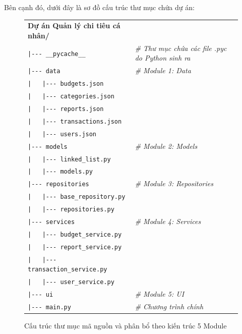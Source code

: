 \documentclass[12pt,letterpaper]{article}
\begin{document}
Bên cạnh đó, dưới đây là sơ đồ cấu trúc thư mục chứa dự án:
\begin{figure}[H]
    \centering
    \renewcommand{\arraystretch}{1.3} %
    \begin{tabular}{@{} l l @{}} %
    \textbf{Dự án Quản lý chi tiêu cá nhân/} & \\
    \texttt{|-\/-\/- \_\_pycache\_\_} & \textit{\# Thư mục chứa các file .pyc do Python sinh ra} \\
    \texttt{|-\/-\/- data} & \textit{\# Module 1: Data} \\
    \texttt{| \ \ |-\/-\/- budgets.json} & \\
    \texttt{| \ \ |-\/-\/- categories.json} & \\
    \texttt{| \ \ |-\/-\/- reports.json} & \\
    \texttt{| \ \ |-\/-\/- transactions.json} & \\
    \texttt{| \ \ |-\/-\/- users.json} & \\
    \texttt{|-\/-\/- models} & \textit{\# Module 2: Models} \\
    \texttt{| \ \ |-\/-\/- linked\_list.py} & \\
    \texttt{| \ \ |-\/-\/- models.py} & \\
    \texttt{|-\/-\/- repositories} & \textit{\# Module 3: Repositories} \\
    \texttt{| \ \ |-\/-\/- base\_repository.py} & \\
    \texttt{| \ \ |-\/-\/- repositories.py} & \\
    \texttt{|-\/-\/- services} & \textit{\# Module 4: Services} \\
    \texttt{| \ \ |-\/-\/- budget\_service.py} & \\
    \texttt{| \ \ |-\/-\/- report\_service.py} & \\
    \texttt{| \ \ |-\/-\/- transaction\_service.py} & \\
    \texttt{| \ \ |-\/-\/- user\_service.py} & \\
    \texttt{|-\/-\/- ui} & \textit{\# Module 5: UI} \\
    \texttt{|-\/-\/- main.py} & \textit{\# Chương trình chính} \\
    \end{tabular}
    \vspace{0.4cm}
    \caption{Cấu trúc thư mục mã nguồn và phân bổ theo kiến trúc 5 Module}
\end{figure}
\end{document}
